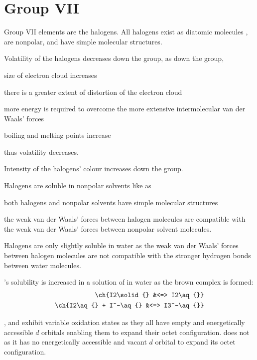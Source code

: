 \documentclass[Chemistry.tex]{subfiles}
\begin{document}
\section{Group VII}
Group VII elements are the halogens. All halogens exist as diatomic molecules , are nonpolar, and have simple molecular structures.

Volatility of the halogens decreases down the group, as down the group, \begin{slinenum}
\item size of electron cloud increases
\item there is a greater extent of distortion of the electron cloud
\item more energy is required to overcome the more extensive intermolecular van der Waals' forces
\item boiling and melting points increase
\item thus volatility decreases.
\end{slinenum}

Intensity of the halogens' colour increases down the group.

Halogens are soluble in nonpolar solvents like  as \begin{slinenum}
\item both halogens and nonpolar solvents have simple molecular structures
\item the weak van der Waals' forces between halogen molecules are compatible with the weak van der Waals' forces between nonpolar solvent molecules.
\end{slinenum}

Halogens are only slightly soluble in water as the weak van der Waals' forces between halogen molecules are not compatible with the stronger hydrogen bonds between water molecules.

's solubility is increased in a solution of  in water as the brown  complex is formed: \begin{align}\ch{I2\solid{} &<=> I2\aq{}}\\\ch{I2\aq{} + I^-\aq{} &<=> I3^-\aq{}}\end{align}

,  and  exhibit variable oxidation states as they all have empty and energetically accessible \(d\) orbitals enabling them to expand their octet configuration.  does not as it has no energetically accessible and vacant \(d\) orbital to expand its octet configuration.
\end{document}
